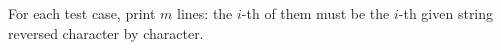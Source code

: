 For each test case, print $m$ lines: the $i$-th of them must be the $i$-th given string reversed character by character.
